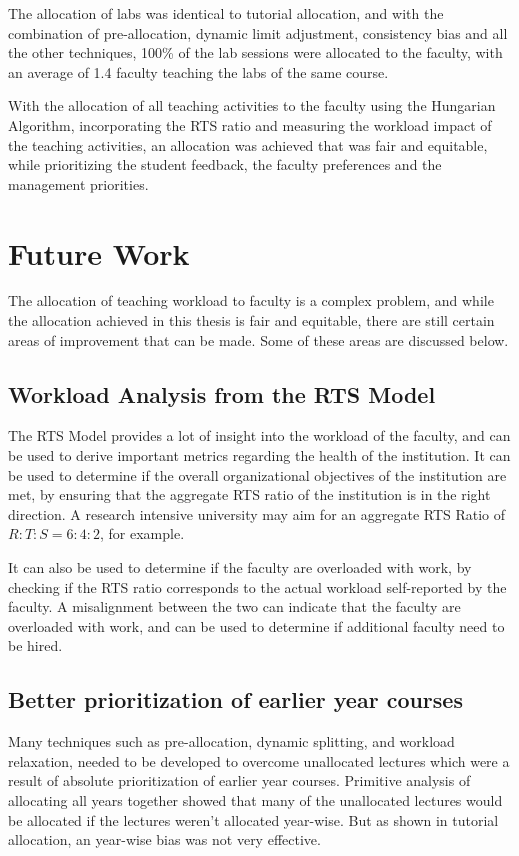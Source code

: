 The allocation of labs was identical to tutorial allocation, and with the combination of pre-allocation, dynamic limit adjustment, consistency bias and all the other techniques, 100\% of the lab sessions were allocated to the faculty, with an average of 1.4 faculty teaching the labs of the same course.

With the allocation of all teaching activities to the faculty using the Hungarian Algorithm, incorporating the RTS ratio and measuring the workload impact of the teaching activities, an allocation was achieved that was fair and equitable, while prioritizing the student feedback, the faculty preferences and the management priorities.

\section{Future Work}

The allocation of teaching workload to faculty is a complex problem, and while the allocation achieved in this thesis is fair and equitable, there are still certain areas of improvement that can be made. Some of these areas are discussed below.

\subsection{Workload Analysis from the RTS Model}

The RTS Model provides a lot of insight into the workload of the faculty, and can be used to derive important metrics regarding the health of the institution. It can be used to determine if the overall organizational objectives of the institution are met, by ensuring that the aggregate RTS ratio of the institution is in the right direction. A research intensive university may aim for an aggregate RTS Ratio of $R:T:S = 6:4:2$, for example.

It can also be used to determine if the faculty are overloaded with work, by checking if the RTS ratio corresponds to the actual workload self-reported by the faculty. A misalignment between the two can indicate that the faculty are overloaded with work, and can be used to determine if additional faculty need to be hired.

\subsection{Better prioritization of earlier year courses}

Many techniques such as pre-allocation, dynamic splitting, and workload relaxation, needed to be developed to overcome unallocated lectures which were a result of absolute prioritization of earlier year courses. Primitive analysis of allocating all years together showed that many of the unallocated lectures would be allocated if the lectures weren't allocated year-wise. But as shown in tutorial allocation, an year-wise bias was not very effective.

